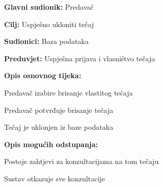 			\noindent {}
			\begin{packed_item}
				
				\item \textbf{Glavni sudionik:} Predavač
				\item  \textbf{Cilj:} Uspješno ukloniti tečaj
				\item  \textbf{Sudionici:} Baza podataka
				\item  \textbf{Preduvjet:} Uspješna prijava i vlasništvo tečaja
				\item  \textbf{Opis osnovnog tijeka:}
				
				\item[] \begin{packed_enum}
					
					\item Predavač izabire brisanje vlastitog tečaja
					\item Predavač potvrđuje brisanje tečaja
					\item Tečaj je uklonjen iz baze podataka
					
				\end{packed_enum}
				\item  \textbf{Opis mogućih odstupanja:}
				
				\item[] \begin{packed_item}
					
					\item[1.a] Postoje zahtjevi za konzultacijama na tom tečaju
					\item[] \begin{packed_enum}
						
						\item Sustav otkazuje sve konzultacije
						
					\end{packed_enum}
					
				\end{packed_item}
				
			\end{packed_item}
				\eject
			\noindent {}
